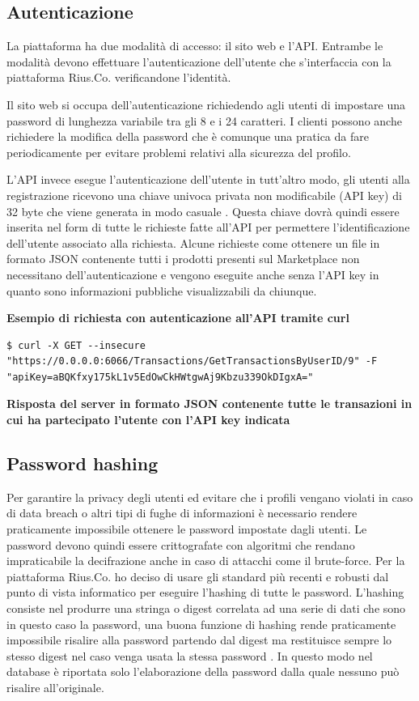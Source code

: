 \subsection{Autenticazione}
La piattaforma ha due modalità di accesso: il sito web e l'API. Entrambe le modalità devono effettuare l'autenticazione dell'utente che s'interfaccia con la piattaforma Rius.Co. verificandone l'identità. 
\medskip

Il sito web si occupa dell'autenticazione richiedendo agli utenti di impostare una password di lunghezza variabile tra gli 8 e i 24 caratteri. I clienti possono anche richiedere la modifica della password che è comunque una pratica da fare periodicamente per evitare problemi relativi alla sicurezza del profilo. 
\medskip

L'API invece esegue l'autenticazione dell'utente in tutt'altro modo, gli utenti alla registrazione ricevono una chiave univoca privata non modificabile (API key) di 32 byte che viene generata in modo casuale \cite{APIKEY}. Questa chiave dovrà quindi essere inserita nel form di tutte le richieste fatte all'API per permettere l'identificazione dell'utente associato alla richiesta. Alcune richieste come ottenere un file in formato JSON contenente tutti i prodotti presenti sul Marketplace non necessitano dell'autenticazione e vengono eseguite anche senza l'API key in quanto sono informazioni pubbliche visualizzabili da chiunque. 
\bigskip

\textbf{Esempio di richiesta con autenticazione all'API tramite curl}
\begin{lstlisting}[style=dos]
$ curl -X GET --insecure "https://0.0.0.0:6066/Transactions/GetTransactionsByUserID/9" -F  "apiKey=aBQKfxy175kL1v5EdOwCkHWtgwAj9Kbzu339OkDIgxA="
\end{lstlisting}
\bigskip

\textbf{Risposta del server in formato JSON contenente tutte le transazioni in cui ha partecipato l'utente con l'API key indicata} 

\subsection{Password hashing} 
Per garantire la privacy degli utenti ed evitare che i profili vengano violati in caso di data breach o altri tipi di fughe di informazioni è necessario rendere praticamente impossibile ottenere le password impostate dagli utenti. Le password devono quindi essere crittografate con algoritmi che rendano impraticabile la decifrazione anche in caso di attacchi come il brute-force. Per la piattaforma Rius.Co. ho deciso di usare gli standard più recenti e robusti dal punto di vista informatico per eseguire l'hashing di tutte le password. L'hashing consiste nel produrre una stringa o digest correlata ad una serie di dati che sono in questo caso la password, una buona funzione di hashing rende praticamente impossibile risalire alla password partendo dal digest ma restituisce sempre lo stesso digest nel caso venga usata la stessa password \cite{Hashing}. In questo modo nel database è riportata solo l'elaborazione della password dalla quale nessuno può risalire all'originale.
\medskip

